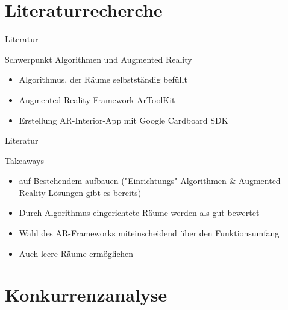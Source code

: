 \documentclass[presentation,bigger,aspectratio=169]{beamer}
\begin{document}
\section{Literaturrecherche}
\label{sec:orgf2e889d}
\begin{frame}[label={sec:orge22cd82}]{\vspace{2.2cm}\begin{center}\MakeUppercase{\insertsection}\end{center}}
\end{frame}

\begin{frame}[label={sec:orgf5b749f}]{Literatur}
\begin{block}{Schwerpunkt Algorithmen und Augmented Reality}
\begin{itemize}
\item Algorithmus, der Räume selbstständig befüllt

\parencite{kanAutomatedInteriorDesign2017}
\item Augmented-Reality-Framework ArToolKit

\parencite{sanduAugmentedRealityUses2018}
\item Erstellung AR-Interior-App mit Google Cardboard SDK

\parencite{moaresInterARInterior2020}
\end{itemize}
\end{block}
\end{frame}

\begin{frame}[label={sec:orgd5bc5be}]{Literatur}
\begin{block}{Takeaways}
\begin{itemize}
\item auf Bestehendem aufbauen ("Einrichtungs"-Algorithmen \&
Augmented-Reality-Lösungen gibt es bereits)
\item Durch Algorithmus eingerichtete Räume werden als gut bewertet
\item Wahl des AR-Frameworks miteinscheidend über den Funktionsumfang
\item Auch leere Räume ermöglichen
\end{itemize}
\end{block}
\end{frame}

\section{Konkurrenzanalyse}
\label{sec:org5befc8a}
\begin{frame}[label={sec:orgb05f39f}]{\vspace{2.2cm}\begin{center}\MakeUppercase{\insertsection}\end{center}}
\end{frame}
\end{document}
